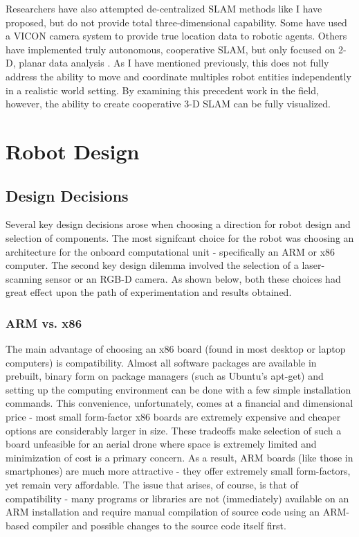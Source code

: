 \documentclass[letterpaper, oneside, 10pt]{report}
\begin{document}
Researchers have also attempted de-centralized SLAM methods like I have proposed, but do not provide total three-dimensional capability. Some have used a VICON camera system \cite{leung2012decentralized} to provide true location data to robotic agents. Others have implemented truly autonomous, cooperative SLAM, but only focused on 2-D, planar data analysis \cite{cunningham2012large}. As I have mentioned previously, this does not fully address the ability to move and coordinate multiples robot entities independently in a realistic world setting. By examining this precedent work in the field, however, the ability to create cooperative 3-D SLAM can be fully visualized.

\chapter{Robot Design}

\section{Design Decisions}

Several key design decisions arose when choosing a direction for robot design and selection of components. The most signifcant choice for the robot was choosing an architecture for the onboard computational unit - specifically an ARM or x86 computer. The second key design dilemma involved the selection of a laser-scanning sensor or an RGB-D camera. As shown below, both these choices had great effect upon the path of experimentation and results obtained.

\subsection{ARM vs. x86}

The main advantage of choosing an x86 board (found in most desktop or laptop computers) is compatibility. Almost all software packages are available in prebuilt, binary form on package managers (such as Ubuntu's apt-get) and setting up the computing environment can be done with a few simple installation commands. This convenience, unfortunately, comes at a financial and dimensional price - most small form-factor x86 boards are extremely expensive and cheaper options are considerably larger in size. These tradeoffs make selection of such a board unfeasible for an aerial drone where space is extremely limited and minimization of cost is a primary concern. As a result, ARM boards (like those in smartphones) are much more attractive - they offer extremely small form-factors, yet remain very affordable. The issue that arises, of course, is that of compatibility - many programs or libraries are not (immediately) available on an ARM installation and require manual compilation of source code using an ARM-based compiler and possible changes to the source code itself first.
\end{document}
